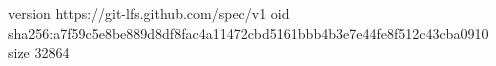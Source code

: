 version https://git-lfs.github.com/spec/v1
oid sha256:a7f59c5e8be889d8df8fac4a11472cbd5161bbb4b3e7e44fe8f512c43cba0910
size 32864
